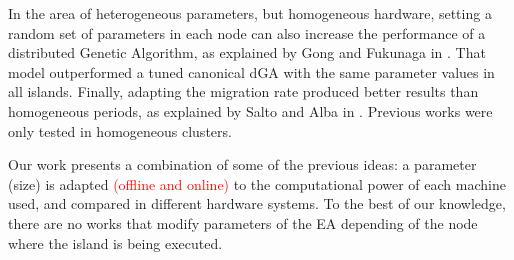 \documentclass[final,1p,times]{elsarticle}
\begin{document}
In the area of heterogeneous parameters, but homogeneous hardware,
setting a random set of parameters in each node can also increase the
performance of a distributed Genetic Algorithm, as explained by Gong
and Fukunaga in \cite{HETEROGENEOUSPARAMETERS}. That model
outperformed a tuned canonical dGA with the same parameter values in
all islands. Finally, adapting the migration rate produced better
results than homogeneous periods, as explained by Salto and Alba in
\cite{HETEROGENEOUSMIGRATION}. Previous works were only tested in
homogeneous clusters. 


 Our work presents a combination of some of the previous ideas: %
 a parameter (size) is adapted \textcolor{red}{(offline and online)} to the computational power of each machine used, and compared in different hardware systems.
 To the best of our knowledge, there are no works that
 modify parameters of the EA depending of the
 node where the island is being executed. 



\end{document}

